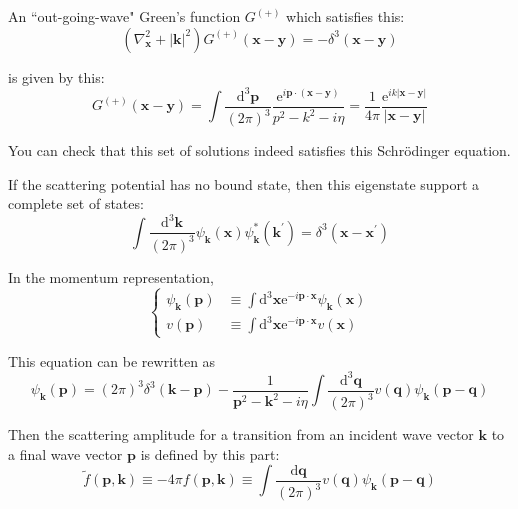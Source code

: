 An ``out-going-wave" Green's function $G^{(+)}$ which satisfies this:
\begin{equation*} \label{Eqs2.7.A.3} \tag{2.7.A.3}
\left( \nabla_{\mathbf{x}}^2 + {|\mathbf{k}|}^2 \right) G^{(+)}(\mathbf{x}-\mathbf{y}) = - \delta^3 (\mathbf{x}-\mathbf{y}) \end{equation*}

is given by this:
\begin{equation*} \label{Eqs2.7.A.4} \tag{2.7.A.4}
G^{(+)}(\mathbf{x}-\mathbf{y}) = \int \frac{\mathrm{d}^3 \mathbf{p}}{(2 \pi)^3} \frac{\mathrm{e}^{i \mathbf{p} \cdot (\mathbf{x}-\mathbf{y})}}{p^2-k^2-i \eta}
= \frac{1}{4 \pi} \frac{\mathrm{e}^{i k |\mathbf{x}-\mathbf{y}|}}{|\mathbf{x}-\mathbf{y}|}
\end{equation*}

You can check that this set of solutions indeed satisfies this Schr\"odinger equation.

If the scattering potential has no bound state, then this eigenstate support a complete set of states:
\begin{equation*} \label{Eqs2.7.A.5} \tag{2.7.A.5}
\int \frac{\mathrm{d}^3 \mathbf{k}}{(2\pi)^3} \psi_{\mathbf{k}} (\mathbf{x}) \psi_{\mathbf{k}}^* (\mathbf{k}^{'}) = \delta^3 (\mathbf{x}-\mathbf{x}^{'})
\end{equation*}

In the momentum representation,
\begin{equation*} \label{Eqs2.7.A.6} \tag{2.7.A.6}
\left\{ \begin{split}
\psi_{\mathbf{k}} (\mathbf{p}) &\equiv \int \mathrm{d}^3 \mathbf{x} \mathrm{e}^{-i \mathbf{p} \cdot \mathbf{x}} \psi_{\mathbf{k}} (\mathbf{x})\\
v(\mathbf{p}) & \equiv \int \mathrm{d}^3 \mathbf{x} \mathrm{e}^{-i \mathbf{p} \cdot \mathbf{x}} v(\mathbf{x})
\end{split} \right.
\end{equation*}

This equation can be rewritten as
\begin{equation*} \label{Eqs2.7.A.7} \tag{2.7.A.7}
\psi_{\mathbf{k}}(\mathbf{p}) = (2\pi) ^3 \delta^3(\mathbf{k}-\mathbf{p}) - \frac{1}{\mathbf{p}^2 - \mathbf{k}^2 - i \eta} \int \frac{ \mathrm{d}^3 \mathbf{q}}{(2\pi)^3} v(\mathbf{q}) \psi_{\mathbf{k}}(\mathbf{p}-\mathbf{q})
\end{equation*}

Then the scattering amplitude for a transition from an incident wave vector $\mathbf{k}$ to a final wave vector $\mathbf{p}$ is defined by this part:
\begin{equation*} \label{Eqs2.7.A.8} \tag{2.7.A.8}
\tilde{f}(\mathbf{p},\mathbf{k}) \equiv -4 \pi f(\mathbf{p},\mathbf{k}) \equiv \int \frac{\mathrm{d}\mathbf{q}}{(2\pi)^3} v(\mathbf{q}) \psi_{\mathbf{k}}(\mathbf{p}-\mathbf{q})
\end{equation*}

